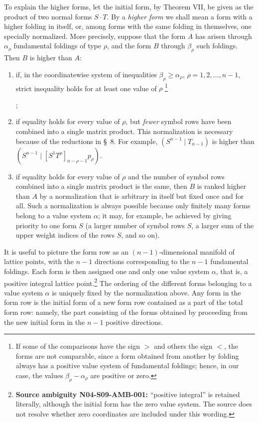 \documentclass[11pt]{article}
\newcommand{\pair}[2]{(#1\mid #2)}
\newcommand{\NoetherSrcNote}[2]{%
  \begingroup
  \renewcommand{\thefootnote}{\ensuremath{[\mathrm{#1}]}}%
  \footnote{#2}%
  \endgroup
  \addtocounter{footnote}{-1}%
}
\begin{document}
To explain the higher forms, let the initial form, by Theorem VII, be given
as the product of two normal forms $S\cdot T$. By a \emph{higher form} we
shall mean a form with a higher folding in itself, or, among forms with the
same folding in themselves, one specially normalized. More precisely,
suppose that the form $A$ has arisen through $\alpha_\rho$ fundamental
foldings of type $\rho$, and the form $B$ through $\beta_\rho$ such
foldings. Then $B$ is higher than $A$:
\begin{enumerate}
\renewcommand{\labelenumi}{\arabic{enumi})}
\item if, in the coordinatewise system of inequalities
$\beta_\rho\geq\alpha_\rho$, $\rho=1,2,\ldots,n-1$, strict inequality
holds for at least one value of $\rho$\NoetherSrcNote{152:**}{If some of
the comparisons have the sign $>$ and others the sign $<$, the forms are
not comparable, since a form obtained from another by folding always has a
positive value system of fundamental foldings; hence, in our case, the
values $\beta_\rho-\alpha_\rho$ are positive or zero.};
\item if equality holds for every value of $\rho$, but \emph{fewer} symbol
rows have been combined into a single matrix product. This normalization is
necessary because of the reductions in \S\ 8. For example,
$\pair{S^{n-1}}{T_{n-1}}$ is higher than
$\pair{S^{n-1}}{[S^1T^\rho]_{n-\rho-1}p_\rho}$.
\item if equality holds for every value of $\rho$ and the number of symbol
rows combined into a single matrix product is the same, then $B$ is ranked
higher than $A$ by a normalization that is arbitrary in itself but fixed
once and for all. Such a normalization is always possible because only
finitely many forms belong to a value system $\alpha$; it may, for example,
be achieved by giving priority to one form $S$ (a larger number of symbol
rows $S$, a larger sum of the upper weight indices of the rows $S$, and so
on).
\end{enumerate}

It is useful to picture the form row as an $(n-1)$-dimensional manifold of
lattice points, with the $n-1$ directions corresponding to the $n-1$
fundamental foldings. Each form is then assigned one and only one value
system $\alpha$, that is, a positive integral lattice
point.\footnote{\textbf{Source ambiguity N04-S09-AMB-001:} ``positive
integral'' is retained literally, although the initial form has the zero
value system. The source does not resolve whether zero coordinates are
included under this wording.}
The ordering of the different forms belonging to a value system $\alpha$
is uniquely fixed by the normalization above. Any form in the form row is
the initial form of a new form row contained as a part of the total form
row: namely, the part consisting of the forms obtained by proceeding from
the new initial form in the $n-1$ positive directions.
\end{document}
